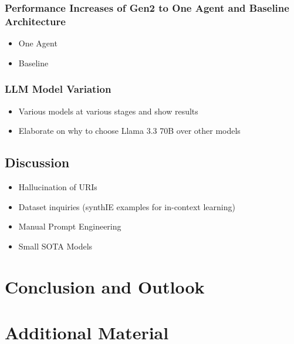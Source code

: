 \documentclass[a4paper,oneside,bibliography=totoc]{scrbook}
\begin{document}
\subsection{Performance Increases of Gen2 to One Agent and Baseline Architecture}
\label{subsec:performance_increases_gen2}
\begin{itemize}
  \item One Agent
  \item Baseline
\end{itemize}

\subsection{LLM Model Variation}
\label{subsec:llm_model_variation}
\begin{itemize}
  \item Various models at various stages and show results
  \item Elaborate on why to choose Llama 3.3 70B over other models
\end{itemize}

\section{Discussion}
\label{sec:discussion}

\begin{itemize}
  \item Hallucination of URIs
  \item Dataset inquiries (synthIE examples for in-context learning)
  \item Manual Prompt Engineering
  \item Small SOTA Models
\end{itemize}

\chapter{Conclusion and Outlook}
\label{ch:conclusion_outlook}




\appendix
\chapter{Additional Material}
\label{ch:additional_material}

\end{document}
